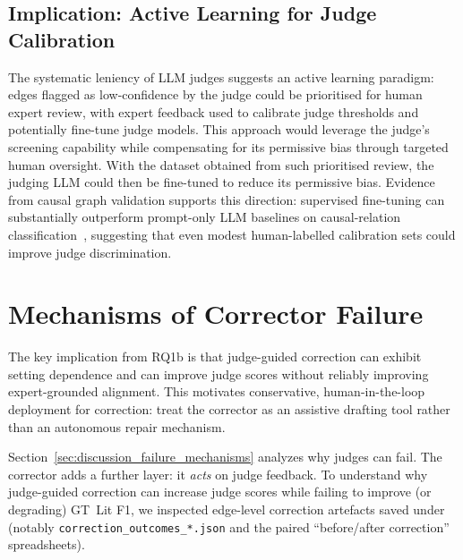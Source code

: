 \subsection{Implication: Active Learning for Judge Calibration}
The systematic leniency of LLM judges suggests an active learning paradigm: edges flagged as low-confidence by the judge could be prioritised for human expert review, with expert feedback used to calibrate judge thresholds and potentially fine-tune judge models. This approach would leverage the judge's screening capability while compensating for its permissive bias through targeted human oversight. With the dataset obtained from such prioritised review, the judging LLM could then be fine-tuned to reduce its permissive bias. Evidence from causal graph validation supports this direction: supervised fine-tuning can substantially outperform prompt-only LLM baselines on causal-relation classification~\citep{susanti2024prompting}, suggesting that even modest human-labelled calibration sets could improve judge discrimination.

\section{Mechanisms of Corrector Failure}
\label{sec:discussion_rq1b}
\label{sec:discussion_corrector_failure_mechanisms}

The key implication from RQ1b is that judge-guided correction can exhibit setting dependence and can improve judge scores without reliably improving expert-grounded alignment. This motivates conservative, human-in-the-loop deployment for correction: treat the corrector as an assistive drafting tool rather than an autonomous repair mechanism.

Section~\ref{sec:discussion_failure_mechanisms} analyzes why judges can fail. The corrector adds a further layer: it \emph{acts} on judge feedback. To understand why judge-guided correction can increase judge scores while failing to improve (or degrading) GT~Lit F1, we inspected edge-level correction artefacts saved under \texttt{} (notably \texttt{correction\_outcomes\_*.json} and the paired ``before/after correction'' spreadsheets).

